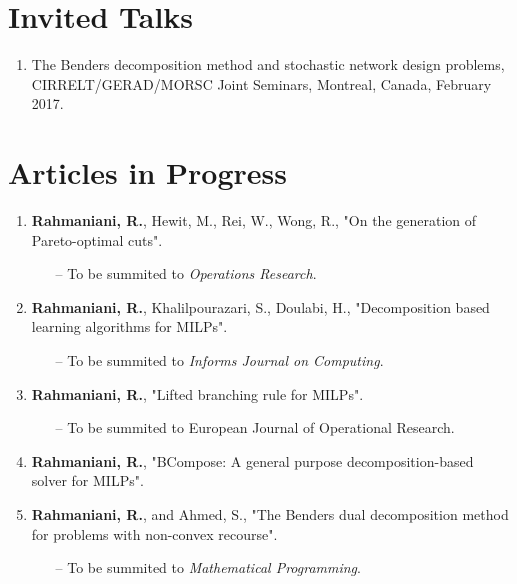 \documentclass[10PT,letter]{article}
\newcounter{papercnt}
\newcommand{\numbox}[1]{} %
\begin{document}
\section*{\numbox{3}\bfseries\textcolor{titlecol}{\sffamily  Invited Talks }}                  
      \begin{enumerate}
      	\item The Benders decomposition method and stochastic network design problems, CIRRELT/GERAD/MORSC Joint Seminars, Montreal, Canada, February 2017.
      \end{enumerate}
  \section*{\numbox{6}\bfseries\textcolor{titlecol}{\sffamily Articles  in Progress}}
        \begin{enumerate}[itemsep=.5mm]
            \item 
            		\textbf{Rahmaniani, R.}, Hewit, M., Rei, W., Wong, R., "On the generation of  Pareto-optimal cuts".
            		\begin{itemize}
            			\item[--] To be summited to \textit{Operations Research}.
	            	\end{itemize}
			\item 
					\textbf{Rahmaniani, R.}, Khalilpourazari, S., Doulabi, H., "Decomposition based learning algorithms for MILPs".
					\begin{itemize}
						\item[--] To be summited to \textit{Informs Journal on Computing}.
					\end{itemize}
			\item 
					\textbf{Rahmaniani, R.}, "Lifted branching rule for MILPs".
					\begin{itemize}
						\item[--] To be summited to European Journal of Operational Research.
					\end{itemize}
			\item 
					\textbf{Rahmaniani, R.}, "BCompose: A general purpose decomposition-based solver for MILPs".
		  \item 
					\textbf{Rahmaniani, R.}, and Ahmed, S., "The Benders dual decomposition method for problems with non-convex recourse".
					\begin{itemize}
						\item[--] To be summited to \textit{Mathematical Programming}.
					\end{itemize}
        \end{enumerate}
        \setcounter{papercnt}{\value{enumi}}
\end{document}
